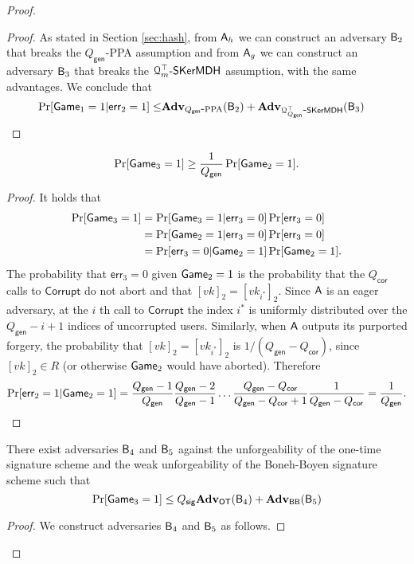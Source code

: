 \begin{proof}
\begin{proof}
As stated in Section \ref{sec:hash}, from $\mathsf{A}_h$ we can construct an adversary $\mathsf{B}_2$ that breaks the $Q_\mathsf{gen}$-PPA assumption and from $\mathsf{A}_g$ we can construct an adversary $\mathsf{B}_3$ that breaks the $\mathcal{Q}^\top_m\mbox{-}\mathsf{SKerMDH}$ assumption, with the same advantages. We conclude that 
\begin{align*}
\Pr[\mathsf{Game}_1=1|\mathsf{err}_2=1] \leq & \mathbf{Adv}_{{Q_\mathsf{gen}}\mbox{-}\mathrm{PPA}}(\mathsf{B}_2)+\mathbf{Adv}_{\mathcal{Q}^\top_{Q_\mathsf{gen}}\mbox{-}\mathsf{SKerMDH}}(\mathsf{B}_3)
\end{align*}
\end{proof}

\begin{lemma}
$$
\Pr[\mathsf{Game}_3=1]\geq \frac{1}{{Q_\mathsf{gen}}}\Pr[\mathsf{Game}_2=1].
$$
\end{lemma}
\begin{proof}
It holds that
\begin{align*}
\Pr[\mathsf{Game}_3=1] &= \Pr[\mathsf{Game}_3=1|\mathsf{err}_3=0]\Pr[\mathsf{err}_3=0]\\
&=\Pr[\mathsf{Game}_2=1|\mathsf{err}_3=0]\Pr[\mathsf{err}_3=0]\\
&=\Pr[\mathsf{err}_3=0|\mathsf{Game}_2=1]\Pr[\mathsf{Game}_2=1].
\end{align*}
The probability that $\mathsf{err}_3=0$ given $\mathsf{Game}_2=1$ is the probability that the ${Q_\mathsf{cor}}$ calls to $\mathsf{Corrupt}$ do not abort and that $[vk]_2=[vk_{i^*}]_2$. Since $\mathsf{A}$ is an eager adversary, at the $i$ th call to $\mathsf{Corrupt}$ the index $i^*$ is uniformly distributed over the ${Q_\mathsf{gen}}-i+1$ indices of uncorrupted users. Similarly, when $\mathsf{A}$ outputs its purported forgery, the probability that $[vk]_2=[vk_{i^*}]_2$ is $1/({Q_\mathsf{gen}}-{Q_\mathsf{cor}})$, since $[vk]_2\in R$ (or otherwise $\mathsf{Game}_2$ would have aborted). Therefore
$$
\Pr[\mathsf{err}_2=1|\mathsf{Game}_2=1]=\frac{{Q_\mathsf{gen}}-1}{{Q_\mathsf{gen}}}\frac{{Q_\mathsf{gen}}-2}{{Q_\mathsf{gen}}-1}\ldots\frac{{Q_\mathsf{gen}}-{Q_\mathsf{cor}}}{{Q_\mathsf{gen}}-{Q_\mathsf{cor}}+1}\frac{1}{{Q_\mathsf{gen}}-{Q_\mathsf{cor}}}=\frac{1}{{Q_\mathsf{gen}}}.
$$ 
\end{proof}

\begin{lemma}  There exist adversaries $\mathsf{B}_4$ and $\mathsf{B}_5$ against the unforgeability of the one-time signature scheme and the weak unforgeability of the Boneh-Boyen signature scheme such that
$$
\Pr[\mathsf{Game}_3=1]\leq Q_\mathsf{sig}\mathbf{Adv}_{\mathsf{OT}}(\mathsf{B}_4)+\mathbf{Adv}_{\mathsf{BB}}(\mathsf{B}_5)
$$
\end{lemma}
\begin{proof}
We construct adversaries $\mathsf{B}_4$ and $\mathsf{B}_5$ as follows.


\end{proof}
\end{proof}
